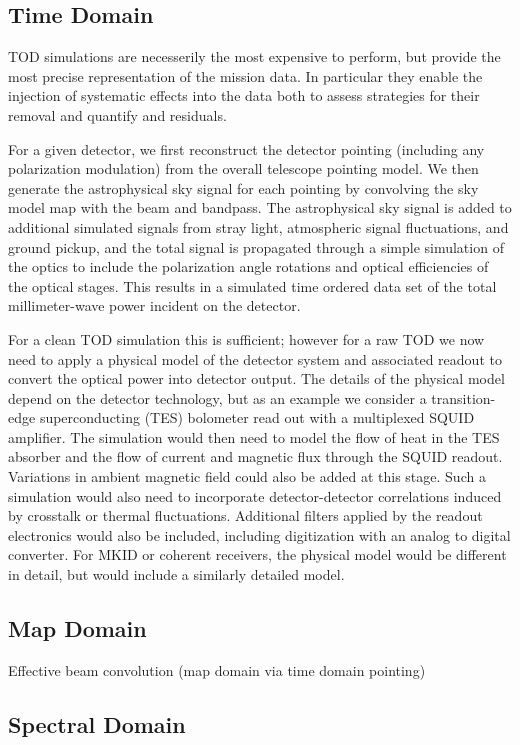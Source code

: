 \subsection{Time Domain}

TOD simulations are necesserily the most expensive to perform, but provide the most precise representation of the mission data. In particular they enable the injection of systematic effects into the data both to assess strategies for their removal and quantify and residuals.

For a given detector, we first reconstruct the detector pointing (including any polarization modulation) from the overall telescope pointing model. We then generate the astrophysical sky signal for each pointing by convolving the sky model map with the beam and bandpass. The astrophysical sky signal is added to additional simulated signals from stray light, atmospheric signal fluctuations, and ground pickup, and the total signal is propagated through a simple simulation of the optics to include the polarization angle rotations and optical efficiencies of the optical stages. This results in a simulated  time ordered data set of the total millimeter-wave power incident on the detector.

For a clean TOD simulation this is sufficient; however for a raw TOD we now need to apply a physical model of the detector system and associated readout to convert the optical power into detector output. The details of the physical model depend on the detector technology, but as an example we consider a transition-edge superconducting (TES) bolometer read out with a multiplexed SQUID amplifier. The simulation would then need to model the flow of heat in the TES absorber and the flow of current and magnetic flux through the SQUID readout. Variations in ambient magnetic field could also be added at this stage. Such a simulation would also need to incorporate detector-detector correlations induced by crosstalk or thermal fluctuations.  Additional filters applied by the readout electronics would also be included, including digitization with an analog to digital converter. For MKID or coherent receivers, the physical model would be different in detail, but would include a similarly detailed model.


\subsection{Map Domain}

Effective beam convolution (map domain via time domain pointing)


\subsection{Spectral Domain}

%



